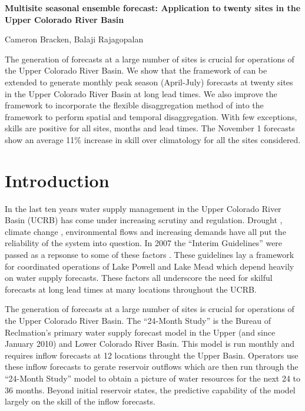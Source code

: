 \documentclass[11pt]{article}
\begin{document}
\thispagestyle{empty}
\textbf{\Large Multisite seasonal ensemble forecast: Application to twenty sites in the Upper Colorado River Basin}

Cameron Bracken, Balaji Rajagopalan


{\flushleft\small

The generation of forecasts at a large number of sites is crucial for operations of the Upper Colorado River Basin.  We show that the framework of \cite{Bracken:2010p2682} can be extended to generate monthly peak season (April-July) forecasts at twenty sites in the Upper Colorado River Basin at long lead times.  We also improve the framework to incorporate the flexible disaggregation method of \cite{Nowak:2010p2738} into the framework to perform spatial and temporal disaggregation.  With few exceptions, skills are positive for all sites, months and lead times.  The November 1 forecasts show an average 11\% increase in skill over climatology for all the sites considered. 
}


\section{Introduction}
In the last ten years water supply management in the Upper Colorado River Basin (UCRB) has come under increasing scrutiny and regulation.  Drought \citep{Fulp:2005p3934}, climate change \citep{Rajagopalan:2009p3818}, environmental flows and increasing demands \citep{USDepartmentoftheInterior:2008p3864} have all put the reliability of the system into question.  In 2007 the ``Interim Guidelines'' were passed as a repsonse to some of these factors \citep{USDepartmentoftheInterior:2007p3865}.  These guidelines lay a framework for coordinated operations of Lake Powell and Lake Mead which depend heavily on water supply forecasts.   These factors all underscore the need for skilful forecasts at long lead times at many locations throughout the UCRB.  

The generation of forecasts at a large number of sites is crucial for operations of the Upper Colorado River Basin.  The ``24-Month Study'' is the Bureau of Reclmation's primary water supply forecast model in the Upper (and since January 2010) and Lower Colorado River Basin.  This model is run monthly and requires inflow forecasts at 12 locations throught the Upper Basin.  Operators use these inflow forecasts to gerate reservoir outflows which are then run through the ``24-Month Study'' model to obtain a picture of water resources for the next 24 to 36 months. Beyond initial reservoir states, the predictive capability of the model largely on the skill of the inflow forecasts. 
\end{document}
